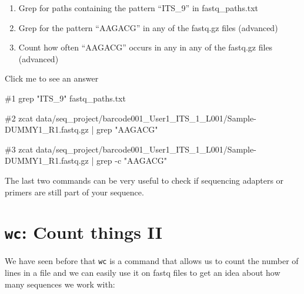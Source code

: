 \documentclass[
  letterpaper,
  DIV=11,
  numbers=noendperiod]{scrreprt}
\newenvironment{Shaded}{}{}
\newcommand{\AttributeTok}[1]{\textcolor[rgb]{0.84,0.23,0.29}{#1}}
\newcommand{\CommentTok}[1]{\textcolor[rgb]{0.42,0.45,0.49}{#1}}
\newcommand{\FunctionTok}[1]{\textcolor[rgb]{0.44,0.26,0.76}{#1}}
\newcommand{\KeywordTok}[1]{\textcolor[rgb]{0.84,0.23,0.29}{#1}}
\newcommand{\NormalTok}[1]{\textcolor[rgb]{0.14,0.16,0.18}{#1}}
\newcommand{\StringTok}[1]{\textcolor[rgb]{0.01,0.18,0.38}{#1}}
\providecommand{\tightlist}{%
  \setlength{\itemsep}{0pt}\setlength{\parskip}{0pt}}\usepackage{longtable,booktabs,array}
\begin{document}
\begin{tcolorbox}[enhanced jigsaw, breakable, left=2mm, title=\textcolor{quarto-callout-caution-color}{\faFire}\hspace{0.5em}{Exercise}, opacityback=0, opacitybacktitle=0.6, rightrule=.15mm, bottomrule=.15mm, colback=white, colframe=quarto-callout-caution-color-frame, coltitle=black, bottomtitle=1mm, arc=.35mm, toprule=.15mm, colbacktitle=quarto-callout-caution-color!10!white, toptitle=1mm, titlerule=0mm, leftrule=.75mm]

\begin{enumerate}
\def\labelenumi{\arabic{enumi}.}
\tightlist
\item
  Grep for paths containing the pattern ``ITS\_9'' in fastq\_paths.txt
\item
  Grep for the pattern ``AAGACG'' in any of the fastq.gz files
  (advanced)
\item
  Count how often ``AAGACG'' occurs in any in any of the fastq.gz files
  (advanced)
\end{enumerate}

Click me to see an answer

\begin{Shaded}
\begin{Highlighting}[]
\CommentTok{\#1}
\FunctionTok{grep} \StringTok{"ITS\_9"}\NormalTok{ fastq\_paths.txt}

\CommentTok{\#2}
\FunctionTok{zcat}\NormalTok{ data/seq\_project/barcode001\_User1\_ITS\_1\_L001/Sample{-}DUMMY1\_R1.fastq.gz }\KeywordTok{|} \FunctionTok{grep} \StringTok{"AAGACG"}

\CommentTok{\#3}
\FunctionTok{zcat}\NormalTok{ data/seq\_project/barcode001\_User1\_ITS\_1\_L001/Sample{-}DUMMY1\_R1.fastq.gz }\KeywordTok{|} \FunctionTok{grep} \AttributeTok{{-}c} \StringTok{"AAGACG"}
\end{Highlighting}
\end{Shaded}

The last two commands can be very useful to check if sequencing adapters
or primers are still part of your sequence.

\end{tcolorbox}

\section{\texorpdfstring{\texttt{wc}: Count things
II}{wc: Count things II}}\label{wc-count-things-ii}

We have seen before that \texttt{wc} is a command that allows us to
count the number of lines in a file and we can easily use it on fastq
files to get an idea about how many sequences we work with:
\end{document}
